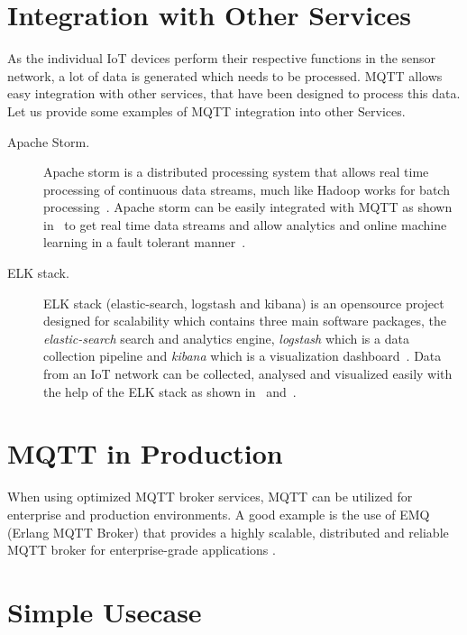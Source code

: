 \section{Integration with Other Services}

As the individual IoT devices perform their respective functions in
the sensor network, a lot of data is generated which needs to be
processed. MQTT allows easy integration with other services, that have
been designed to process this data. Let us provide some examples of
MQTT integration into other Services.

\begin{description}

\item[Apache Storm.] Apache storm is a distributed processing system
  that allows real time processing of continuous data streams, much
  like Hadoop works for batch processing~\cite{apache-storm}. Apache
  storm can be easily integrated with MQTT as shown
  in~\cite{apache-storm-mqtt} to get real time data streams and allow
  analytics and online machine learning in a fault tolerant
  manner~\cite{apache-storm-wiki}.

\item [ELK stack.]  ELK stack (elastic-search, logstash and kibana) is
  an opensource project designed for scalability which contains three
  main software packages, the \textit{elastic-search} search and
  analytics engine, \textit{logstash} which is a data collection
  pipeline and \textit{kibana} which is a visualization
  dashboard~\cite{elk-stack}. Data from an IoT network can be
  collected, analysed and visualized easily with the help of the ELK
  stack as shown in~\cite{mqtt-elasticsearch-setup} and~\cite{kibana-mqtt-analysis}.


\end{description}

\section{MQTT in Production}

When using optimized MQTT broker services, MQTT can be utilized for
enterprise and production environments. A good example is the use of
EMQ (Erlang MQTT Broker) that provides a highly scalable, distributed
and reliable MQTT broker for enterprise-grade applications
\cite{erlang-mqtt-broker}.


\section{Simple Usecase}

